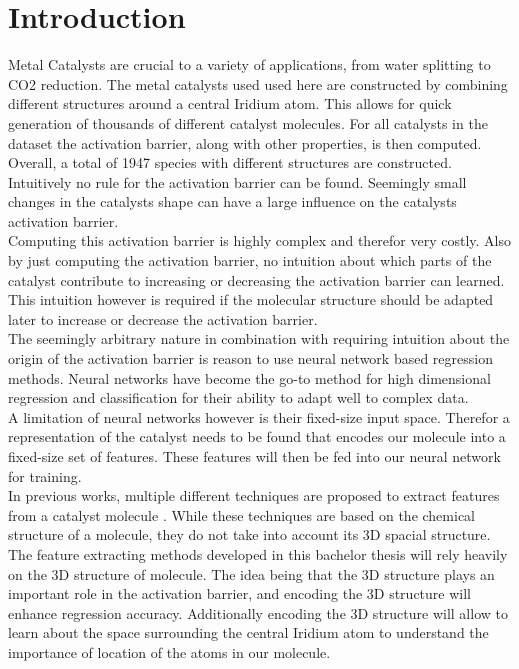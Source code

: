 
\chapter{Introduction}
\label{ch:Introduction}


Metal Catalysts are crucial to a variety of applications, from water splitting to CO2 reduction.
The metal catalysts used used here are constructed by combining different structures around a central Iridium atom.
This allows for quick generation of thousands of different catalyst molecules.
For all catalysts in the dataset the activation barrier, along with other properties, is then computed.
Overall, a total of 1947 species with different structures are constructed.
\\
Intuitively no rule for the activation barrier can be found. Seemingly small changes in the catalysts shape can have 
a large influence on the catalysts activation barrier.
\\
Computing this activation barrier is highly complex and therefor very costly. 
Also by just computing the activation barrier, no intuition about which parts of the catalyst contribute to increasing or decreasing the activation barrier can learned.
This intuition however is required if the molecular structure should be adapted later to increase or decrease the activation barrier.
\\
The seemingly arbitrary nature in combination with requiring intuition about the origin of the activation barrier is 
reason to use neural network based regression methods.
Neural networks have become the go-to method for high dimensional regression and classification for their ability to adapt well to complex data.
\\
A limitation of neural networks however is their fixed-size input space.
Therefor a representation of the catalyst needs to be found that encodes our molecule into a fixed-size set of features.
These features will then be fed into our neural network for training. 
\\
In previous works, multiple different techniques are proposed to extract features from a catalyst molecule \cite{friederich_dos}.
While these techniques are based on the chemical structure of a molecule, they do not take into account its 3D spacial structure.
The feature extracting methods developed in this bachelor thesis will rely heavily on the 3D structure of molecule.
The idea being that the 3D structure plays an important role in the activation barrier, and encoding the 3D structure will enhance regression accuracy.
Additionally encoding the 3D structure will allow to learn about the space surrounding the central 
Iridium atom to understand the importance of location of the atoms in our molecule.
\\

